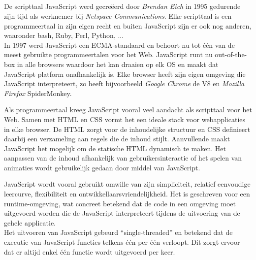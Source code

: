 \subsection{}
\label{subsec:wat-is-javascript}

De scripttaal JavaScript werd gecreëerd door \emph{Brendan Eich} in 1995 gedurende zijn tijd als werknemer bij \emph{Netspace Communications}. Elke scripttaal is een programmeertaal in zijn eigen recht en buiten JavaScript zijn er ook nog anderen, waaronder bash, Ruby, Perl, Python, ... \\
In 1997 werd JavaScript een \gls{ECMA}-standaard en behoort nu tot één van de meest gebruikte programmeertalen voor het Web. JavaScript runt nu out-of-the-box in alle browsers waardoor het kan draaien op elk \gls{OS} en maakt dat JavaScript platform onafhankelijk is. Elke browser heeft zijn eigen omgeving die JavaScript interpreteert, zo heeft bijvoorbeeld \emph{Google Chrome} de V8 en \emph{Mozilla Firefox} SpiderMonkey.

Als programmeertaal kreeg JavaScript vooral veel aandacht als scripttaal voor het Web. Samen met \gls{HTML} en \gls{CSS} vormt het een ideale stack voor webapplicaties in elke browser. De \gls{HTML} zorgt voor de inhoudelijke structuur en \gls{CSS} definieert daarbij een verzameling aan regels die de inhoud stijlt. Aanvullende maakt JavaScript het mogelijk om de statische \gls{HTML} dynamisch te maken. Het aanpassen van de inhoud afhankelijk van gebruikersinteractie of het spelen van animaties wordt gebruikelijk gedaan door middel van JavaScript.

JavaScript wordt vooral gebruikt omwille van zijn simpliciteit, relatief eenvoudige leercurve, flexibiliteit en ontwikkellaarsvriendelijkheid. Het is geschreven voor een runtime-omgeving, wat concreet betekend dat de code in een omgeving moet uitgevoerd worden die de JavaScript interpreteert tijdens de uitvoering van de gehele applicatie. \\
Het uitvoeren van JavaScript gebeurd ``single-threaded''  en betekend dat de executie van JavaScript-functies telkens één per één verloopt. Dit zorgt ervoor dat er altijd enkel één functie wordt uitgevoerd per keer.

\subsubsection{}
\label{subsubsec:ecmascript}


